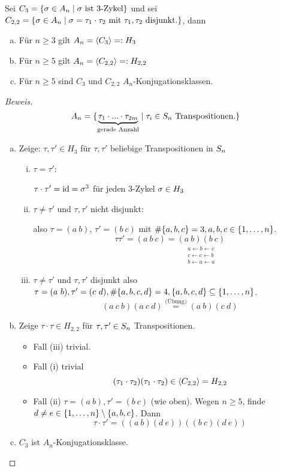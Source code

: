 \documentclass[a4paper]{report}
\begin{document}
\begin{lemm}
  Sei $C_{3} = \{\sigma \in A_{n} \mid \sigma \text{ ist 3-Zykel}\}$ und sei $C_{2,2} = \{\sigma \in A_{n} \mid \sigma = \tau_{1} \cdot \tau_{2} \text{ mit } \tau_{1}, \tau_{2} \text{ disjunkt.}\}$, dann
 \begin{enumerate}[(a)]
\item Für $n \ge 3$ gilt $A_{n} = \langle C_{3}\rangle =: H_{3}$
\item Für $n \ge 5$ gilt $A_{n} = \langle C_{2, 2}\rangle =: H_{2, 2}$
\item Für $n \ge 5$ sind $C_{3}$ und $C_{2, 2}$ $A_{n}$-Konjugationsklassen.
 \end{enumerate}
\end{lemm}
\begin{proof}[Beweis]
\[A_{n} = \{\underbrace{\tau_{1} \cdot ... \cdot \tau_{2m}}_{\text{gerade Anzahl}} \mid \tau_{i} \in S_n \text{ Transpositionen.}\}\]

\begin{enumerate}[(a)]
  \item Zeige: $\tau, \tau' \in H_{3}$ für $\tau, \tau'$ beliebige Transpositionen in $S_n$
        \begin{enumerate}[(i)]
          \item $\tau = \tau'$:

                \(\tau \cdot \tau' = \operatorname{id} = \sigma^{3}\) für jeden 3-Zykel $\sigma \in H_{3}$
          \item $\tau \ne \tau'$ und $\tau, \tau'$ nicht disjunkt:

                also $\tau = (a\ b)$, $\tau' = (b \ c)$ mit $\#\{a, b, c\} = 3, a, b, c \in \{1, \ldots, n\}$.
                \[\tau \tau' = (a\ b\ c) = \underset{\substack{a \leftarrow b \leftarrow c \\ c \leftarrow c \leftarrow b \\ b \leftarrow a \leftarrow a}}{(a \ b)(b\ c)}\]
          \item $\tau \ne \tau'$ und $\tau, \tau'$ disjunkt
                also $\tau = (a\ b), \tau' = (c\ d), \#\{a, b, c, d\}=4, \{a, b, c, d\} \subseteq \{1, \ldots, n\}$.
                \[(a\ c\ b)(a\ c\ d) \overset{\text{(Übung)}}= (a\ b)(c\ d)\]
        \end{enumerate}
  \item Zeige $\tau \cdot \tau \in H_{2, 2}$ für $\tau, \tau' \in S_n$ Transpositionen.
        \begin{itemize}
          \item Fall (iii) trivial.
          \item Fall (i) trivial \[(\tau_{1}\cdot \tau_{2})(\tau_{1}\cdot \tau_{2}) \in \langle C_{2, 2}\rangle= H_{2, 2}\]
          \item Fall (ii) $\tau = (a\ b), \tau' = (b \ c)$ (wie oben). Wegen $n \ge 5$, finde $d\ne e \in \{1, \ldots, n\} \setminus \{a, b, c\}$. Dann
                \[\tau \cdot \tau' = ((a\ b)(d\ e))((b\ c)(d\ e))\]
        \end{itemize}
  \item $C_{3}$ ist $A_{n}$-Konjugationsklasse.


\end{enumerate}
\end{proof}
\end{document}
